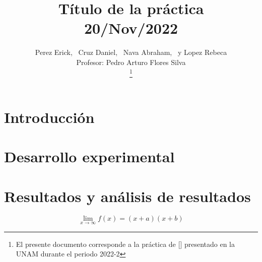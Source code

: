 \documentclass[journal]{IEEEtran}
\begin{document}
\title{Título de la práctica\\ \small{20/Nov/2022}}


\author{Perez Erick,~
        Cruz Daniel,~
        Nava Abraham,~
        y Lopez Rebeca\\
				Profesor: Pedro Arturo Flores Silva\\
\thanks{El presente documento corresponde a la práctica de [] presentado en la UNAM durante el periodo 2022-2}}


\maketitle

\begin{abstract}
\lipsum[4]
\end{abstract}


\section{Introducción}
\lipsum[2]


\section{Desarrollo experimental}	
\lipsum[6]


\section{Resultados y análisis de resultados}

\lipsum[5-6]
$$\lim_{x\to\infty} f(x) = (x + a) (x + b)  $$

\end{document}
